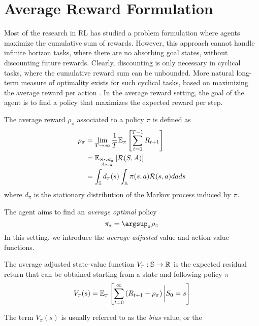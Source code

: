\section{Average Reward Formulation}
Most of the research in RL has studied a problem formulation where agents
maximize the cumulative sum of rewards. However, this approach cannot handle
infinite horizon tasks, where there are no absorbing goal states, without
discounting future rewards. Clearly, discounting is only necessary in cyclical
tasks, where the cumulative reward sum can be unbounded. More natural long-term
measure of  optimality exists for such cyclical tasks, based on maximizing the
average reward per action \cite{mahadevan1996average}. In the average reward
setting, the goal of the agent is to find a policy that maximizes the expected
reward per step. 
\begin{definition}
	The average reward $\rho_\pi$ associated to a policy $\pi$ is defined as  
	\begin{equation}
		\begin{split}
			\rho_\pi &= \lim_{T\to\infty} \frac{1}{T} \E[\pi]{ \sum^{T-1}_{t=0} R_{t+1}}\\
					 &= \E[\substack{S\sim d_\pi \\ A \sim \pi}]{\calR(S,A)}\\ 
					 &= \int_\S d_\pi(s) \int_\A \pi(s, a) \calR(s,a) da ds\\ 
		\end{split}
	\end{equation}
where $d_\pi$ is the stationary distribution of the Markov process induced by $\pi$.
\end{definition}
The agent aims to find an \emph{average optimal} policy
\begin{equation}
	\pi_* = \argsup_\pi \rho_\pi
\end{equation}
In this setting, we introduce the \emph{average adjusted} value and action-value 
functions. 
\begin{definition}
	The average adjusted state-value function $V_\pi : \S \to \R$ is the
	expected residual return that can be obtained starting from a state and
	following policy $\pi$
	\begin{equation}
		V_\pi(s) = \E[\pi]{\sum^{\infty}_{t=0} \left(R_{t+1} - \rho_\pi\right)
		\bigg| S_0 = s}
	\end{equation}
\end{definition}
The term $V_\pi(s)$ is usually referred to as the \emph{bias} value, or the
